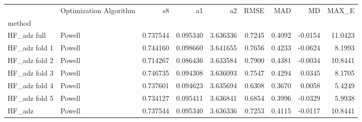 \begin{tabular}{llrrrrrrr}
 & Optimization Algorithm & s8 & a1 & a2 & RMSE & MAD & MD & MAX_E \\
method &  &  &  &  &  &  &  &  \\
HF_adz full & Powell & 0.737544 & 0.095340 & 3.636336 & 0.7245 & 0.4092 & -0.0154 & 11.0423 \\
HF_adz fold 1 & Powell & 0.744160 & 0.098660 & 3.641655 & 0.7656 & 0.4233 & -0.0624 & 8.1993 \\
HF_adz fold 2 & Powell & 0.714267 & 0.086436 & 3.633584 & 0.7900 & 0.4381 & -0.0034 & 10.8441 \\
HF_adz fold 3 & Powell & 0.746735 & 0.094308 & 3.636093 & 0.7547 & 0.4294 & 0.0345 & 8.1705 \\
HF_adz fold 4 & Powell & 0.737601 & 0.094623 & 3.635694 & 0.6308 & 0.3670 & 0.0058 & 5.4249 \\
HF_adz fold 5 & Powell & 0.734127 & 0.095411 & 3.636841 & 0.6854 & 0.3996 & -0.0329 & 5.9938 \\
HF_adz & Powell & 0.737544 & 0.095340 & 3.636336 & 0.7253 & 0.4115 & -0.0117 & 10.8441 \\
\end{tabular}
